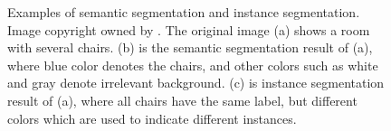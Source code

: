 \begin{figure}[!h]
	\centering
    \caption[Examples of semantic and instance segmentation]{Examples of semantic segmentation and instance segmentation. Image copyright owned by \cite{chaireccv}. The original image (a) shows a room with several chairs. (b) is the semantic segmentation result of (a), where blue color denotes the chairs, and other colors such as white and gray denote irrelevant background. (c) is instance segmentation result of (a), where all chairs have the same label, but different colors which are used to indicate different instances.}
	\label{fig:chseg}
\end{figure}